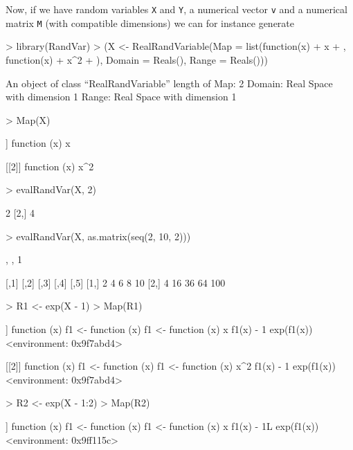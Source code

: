 \documentclass[11pt]{article}
\begin{document}
Now, if we have random variables {\tt X} and {\tt Y}, a numerical
vector {\tt v} and a numerical matrix {\tt M} (with compatible dimensions)
we can for instance generate
\begin{Schunk}
\begin{Sinput}
> library(RandVar)
> (X <- RealRandVariable(Map = list(function(x) {
+     x
+ }, function(x) {
+     x^2
+ }), Domain = Reals(), Range = Reals()))
\end{Sinput}
\begin{Soutput}
An object of class “RealRandVariable” 
length of Map:	 2 
Domain:	Real Space with dimension 1 
Range:	Real Space with dimension 1 
\end{Soutput}
\begin{Sinput}
> Map(X)
\end{Sinput}
\begin{Soutput}
[[1]]
function (x) 
{
    x
}

[[2]]
function (x) 
{
    x^2
}
\end{Soutput}
\begin{Sinput}
> evalRandVar(X, 2)
\end{Sinput}
\begin{Soutput}
     [,1]
[1,]    2
[2,]    4
\end{Soutput}
\begin{Sinput}
> evalRandVar(X, as.matrix(seq(2, 10, 2)))
\end{Sinput}
\begin{Soutput}
, , 1

     [,1] [,2] [,3] [,4] [,5]
[1,]    2    4    6    8   10
[2,]    4   16   36   64  100
\end{Soutput}
\begin{Sinput}
> R1 <- exp(X - 1)
> Map(R1)
\end{Sinput}
\begin{Soutput}
[[1]]
function (x) 
{
    f1 <- function (x) 
    {
        f1 <- function (x) 
        {
            x
        }
        f1(x) - 1
    }
    exp(f1(x))
}
<environment: 0x9f7abd4>

[[2]]
function (x) 
{
    f1 <- function (x) 
    {
        f1 <- function (x) 
        {
            x^2
        }
        f1(x) - 1
    }
    exp(f1(x))
}
<environment: 0x9f7abd4>
\end{Soutput}
\begin{Sinput}
> R2 <- exp(X - 1:2)
> Map(R2)
\end{Sinput}
\begin{Soutput}
[[1]]
function (x) 
{
    f1 <- function (x) 
    {
        f1 <- function (x) 
        {
            x
        }
        f1(x) - 1L
    }
    exp(f1(x))
}
<environment: 0x9ff115c>


\end{Soutput}
\end{Schunk}
\end{document}
